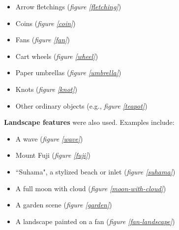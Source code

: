 \documentclass{article}
\begin{document}
\begin{multicols}{2}
\begin{itemize}
\item Arrow fletchings (\emph{figure \ref{fletching}})
\item Coins (\emph{figure \ref{coin}})
\item Fans (\emph{figure \ref{fan}})
\item Cart wheels (\emph{figure \ref{wheel}})
\item Paper umbrellas (\emph{figure \ref{umbrella}})
\item Knots (\emph{figure \ref{knot}})
\item Other ordinary objects (e.g., \emph{figure \ref{teapot}})
\end{itemize}
\end{multicols}


  \begin{figure}[b!]
  \begin{subfigs}
  \end{subfigs}
  \begin{subfigs}
  \end{subfigs}
  \end{figure}

\clearpage

  \textbf{Landscape features} were also used.  Examples include:

\begin{itemize}
\item A wave (\emph{figure \ref{wave}})
\item Mount Fuji (\emph{figure \ref{fuji}})
\item ``Suhama", a stylized beach or inlet (\emph{figure \ref{suhama}})
\item A full moon with cloud (\emph{figure \ref{moon-with-cloud}})
\item A garden scene (\emph{figure \ref{garden}})
\item A landscape painted on a fan (\emph{figure \ref{fan-landscape}})
\end{itemize}
\end{document}
